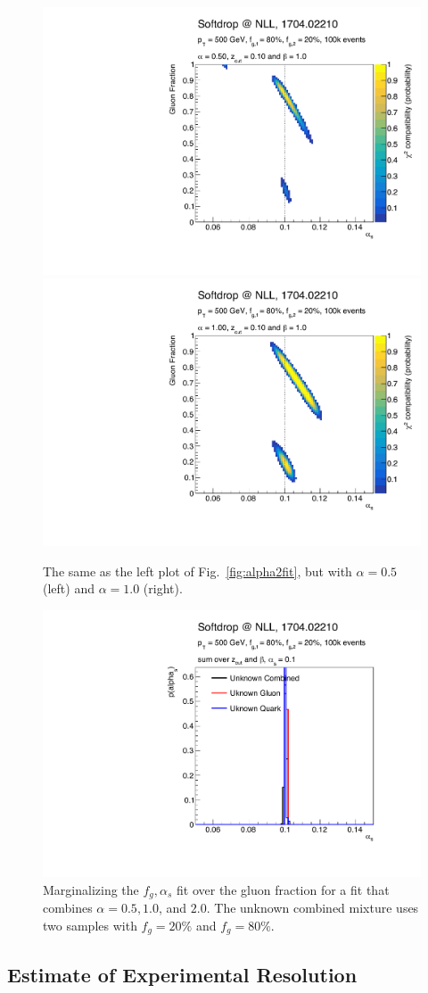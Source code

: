 \begin{figure}[h!]
\begin{center}
\includegraphics[width = 0.49\columnwidth]{figures/banana_alpha_0_50beta_1_00_zcut_0_10.pdf}\includegraphics[width = 0.49\columnwidth]{figures/banana_alpha_1_00beta_1_00_zcut_0_10.pdf}
\end{center}
\caption{The same as the left plot of Fig.~\ref{fig:alpha2fit}, but with $\alpha=0.5$ (left) and $\alpha=1.0$ (right).}
\label{fig:morebananas}
\end{figure}

\begin{figure}[h!]
\begin{center}
\includegraphics[width = 0.49\columnwidth]{figures/combination.pdf}
\end{center}
\caption{Marginalizing the $f_g,\alpha_s$ fit over the gluon fraction for a fit that combines $\alpha=0.5, 1.0$, and $2.0$.  The unknown combined mixture uses two samples with $f_g=20\%$ and $f_g=80\%$.}
\label{fig:combo}
\end{figure}

\subsection{Estimate of Experimental Resolution}
\label{sec:resolution}

